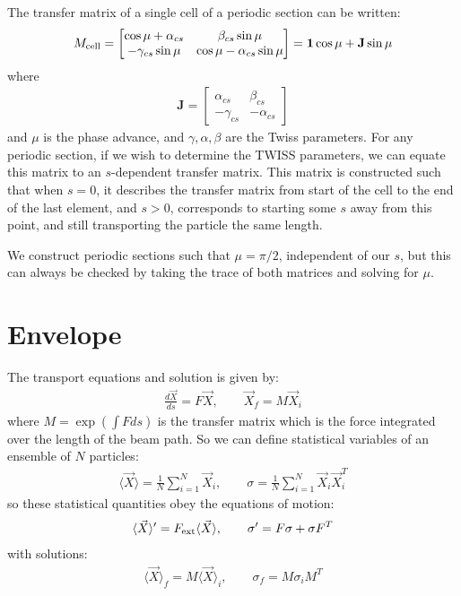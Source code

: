 \documentclass{article}
\numberwithin{equation}{section}
\begin{document}
The transfer matrix of a single cell of a periodic section can be written:
\begin{align}
M_{\rm cell} = \begin{bmatrix}
\cos \mu + \alpha_{cs} & \beta_{cs} \sin \mu \\
- \gamma_{cs} \sin \mu & \cos \mu - \alpha_{cs} \sin \mu
\end{bmatrix}
 = \mathbf{1} \cos \mu + \mathbf{J} \sin \mu
\end{align}
where 
\begin{align}
\mathbf{J} = \begin{bmatrix}
\alpha_{cs} & \beta_{cs} \\ - \gamma_{cs} & - \alpha_{cs} \end{bmatrix}
\end{align}
and $\mu$ is the phase advance, and $\gamma, \alpha, \beta$ are the Twiss parameters. For any periodic section, if we wish to determine the TWISS parameters, we can equate this matrix to an $s$-dependent transfer matrix. This matrix is constructed such that when $s=0$, it describes the transfer matrix from start of the cell to the end of the last element, and $s>0$, corresponds to starting some $s$ away from this point, and still transporting the particle the same length.

We construct periodic sections such that $\mu = \pi /2$, independent of our $s$, but this can always be checked by taking the trace of both matrices and solving for $\mu$.


\section{Envelope}

The transport equations and solution is given by:
\begin{align}
\frac{d \vec{X}}{ds} = F \vec{X} ,\qquad
\vec{X}_f = M \vec{X}_i
\end{align}
where $M = \exp( \int F ds )$ is the transfer matrix which is the force integrated over the length of the beam path. So we can define statistical variables of an ensemble of $N$ particles:
\begin{align}
\langle \vec{X} \rangle = \frac{1}{N} \sum_{i=1}^{N} \vec{X}_i, \qquad
\sigma = \frac{1}{N} \sum_{i=1}^{N} \vec{X}_i \vec{X}^T_i
\end{align}
so these statistical quantities obey the equations of motion:
\begin{align}
\langle \vec{X} \rangle' = F_{\rm ext}\langle \vec{X} \rangle, \qquad
\sigma' = F \sigma + \sigma F^T
\end{align}
with solutions:
\begin{align}
\langle \vec{X} \rangle_f = M \langle \vec{X} \rangle_i, \qquad
\sigma_f  = M \sigma_i M^T 
\end{align}
\end{document}
